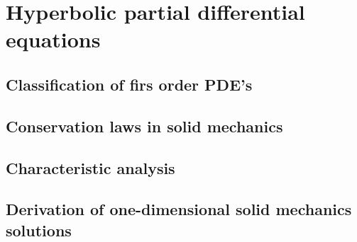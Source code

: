 \chapter{Hyperbolic partial differential equations}
\newpage
\section{Classification of firs order PDE's}
\label{sec:PDEs}


\section{Conservation laws in solid mechanics}
\label{sec:solidMech_equations}
%


\section{Characteristic analysis}
\label{sec:characteristic_analysis}
%


\section{Derivation of one-dimensional solid mechanics solutions}
\label{sec:analytical_results}
%




